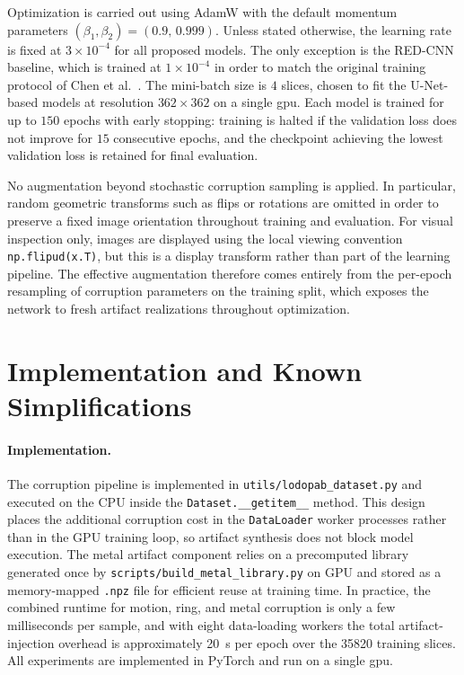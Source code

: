 Optimization is carried out using AdamW with the default momentum parameters $(\beta_{1}, \beta_{2}) = (0.9,\,0.999)$. Unless stated otherwise, the learning rate is fixed at $3\times 10^{-4}$ for all proposed models. The only exception is the RED-CNN baseline, which is trained at $1\times 10^{-4}$ in order to match the original training protocol of Chen et al.~\cite{Chen2017}. The mini-batch size is $4$ slices, chosen to fit the U-Net-based models at resolution $362\times 362$ on a single \gls{gpu}. Each model is trained for up to $150$ epochs with early stopping: training is halted if the validation loss does not improve for $15$ consecutive epochs, and the checkpoint achieving the lowest validation loss is retained for final evaluation.

No augmentation beyond stochastic corruption sampling is applied. In particular, random geometric transforms such as flips or rotations are omitted in order to preserve a fixed image orientation throughout training and evaluation. For visual inspection only, images are displayed using the local viewing convention \texttt{np.flipud(x.T)}, but this is a display transform rather than part of the learning pipeline. The effective augmentation therefore comes entirely from the per-epoch resampling of corruption parameters on the training split, which exposes the network to fresh artifact realizations throughout optimization.

\section{Implementation and Known Simplifications}
\label{sec:meth_implementation}

\paragraph{Implementation.}
The corruption pipeline is implemented in \texttt{utils/lodopab\_dataset.py} and executed on the CPU inside the \texttt{Dataset.\_\_getitem\_\_} method. This design places the additional corruption cost in the \texttt{DataLoader} worker processes rather than in the GPU training loop, so artifact synthesis does not block model execution. The metal artifact component relies on a precomputed library generated once by \texttt{scripts/build\_metal\_library.py} on GPU and stored as a memory-mapped \texttt{.npz} file for efficient reuse at training time. In practice, the combined runtime for motion, ring, and metal corruption is only a few milliseconds per sample, and with eight data-loading workers the total artifact-injection overhead is approximately \SI{20}{\second} per epoch over the \num{35820} training slices. All experiments are implemented in PyTorch and run on a single \gls{gpu}.

